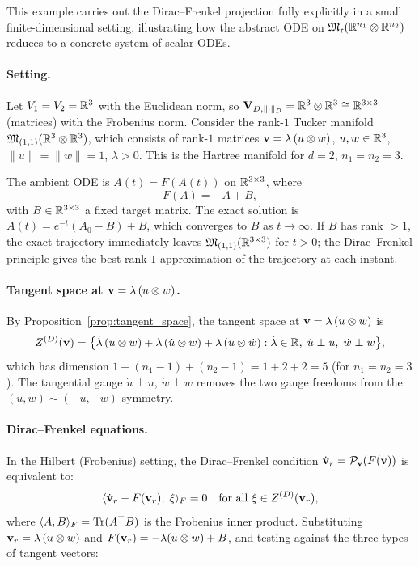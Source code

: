 \begin{example}
\label{ex:DF:finite_dim}
This example carries out the Dirac--Frenkel projection fully
explicitly in a small finite-dimensional setting, illustrating how
the abstract ODE on $\mathfrak{M}_{\mathfrak{r}}(\mathbb{R}^{n_1}\otimes\mathbb{R}^{n_2})$ reduces
to a concrete system of scalar ODEs.

\paragraph{Setting.}
Let $V_1 = V_2 = \mathbb{R}^3$ with the Euclidean norm, so $\mathbf{V}_{D,\|\cdot\|_D} = \mathbb{R}^3
\otimes \mathbb{R}^3 \cong \mathbb{R}^{3\times 3}$ (matrices) with the Frobenius
norm. Consider the rank-$1$ Tucker manifold $\mathfrak{M}_{(1,1)}(\mathbb{R}^3
\otimes \mathbb{R}^3)$, which consists of rank-$1$ matrices
$\mathbf{v} = \lambda\,(u \otimes w)$, $u, w \in \mathbb{R}^3$, $\|u\| = \|w\| = 1$,
$\lambda > 0$. This is the Hartree manifold for $d=2$, $n_1=n_2=3$.

The ambient ODE is $\dot{A}(t) = F(A(t))$ on $\mathbb{R}^{3\times 3}$,
where
\begin{equation}
\label{eq:DF:fd_ode}
    F(A) = -A + B,
\end{equation}
with $B \in \mathbb{R}^{3\times 3}$ a fixed target matrix. The exact solution
is $A(t) = e^{-t}(A_0 - B) + B$, which converges to $B$ as $t \to
\infty$. If $B$ has rank $> 1$, the exact trajectory immediately leaves
$\mathfrak{M}_{(1,1)}(\mathbb{R}^{3\times 3})$ for $t > 0$; the Dirac--Frenkel
principle gives the best rank-$1$ approximation of the trajectory at
each instant.

\paragraph{Tangent space at $\mathbf{v} = \lambda\,(u \otimes w)$.}
By Proposition~\ref{prop:tangent_space}, the tangent space at
$\mathbf{v} = \lambda\,(u \otimes w)$ is
\begin{equation}
    Z^{(D)}(\mathbf{v})
    = \bigl\{ \dot\lambda\,(u \otimes w)
      + \lambda\,(\dot u \otimes w)
      + \lambda\,(u \otimes \dot w)
      : \dot\lambda \in \mathbb{R},\;
        \dot u \perp u,\; \dot w \perp w \bigr\},
\end{equation}
which has dimension $1 + (n_1-1) + (n_2-1) = 1 + 2 + 2 = 5$ (for
$n_1 = n_2 = 3$). The tangential gauge $\dot u \perp u$, $\dot w
\perp w$ removes the two gauge freedoms from the $(u,w) \sim
(-u,-w)$ symmetry.

\paragraph{Dirac--Frenkel equations.}
In the Hilbert (Frobenius) setting, the Dirac--Frenkel condition
$\dot{\mathbf{v}}_r = \mathcal{P}_{\mathbf{v}}(F(\mathbf{v}))$ is equivalent to:
\begin{equation}
\label{eq:DF:fd_proj}
    \langle \dot{\mathbf{v}}_r - F(\mathbf{v}_r),\; \xi \rangle_F = 0
    \quad\text{for all } \xi \in Z^{(D)}(\mathbf{v}_r),
\end{equation}
where $\langle A, B\rangle_F = \mathrm{Tr}(A^\top B)$ is the Frobenius
inner product. Substituting $\mathbf{v}_r = \lambda\,(u \otimes w)$ and
$F(\mathbf{v}_r) = -\lambda(u \otimes w) + B$, and testing
against the three types of tangent vectors:


\end{example}
